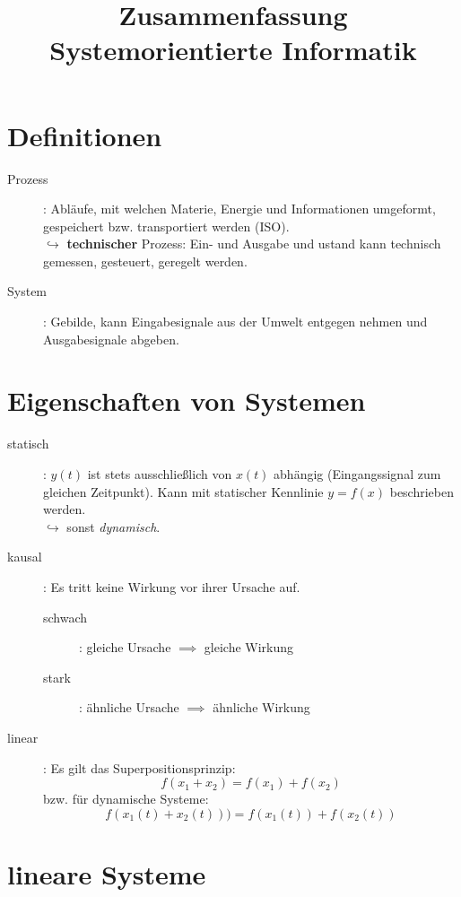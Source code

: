 \documentclass[a4paper, 11pt]{scrartcl}
\title{Zusammenfassung Systemorientierte Informatik}
\theoremstyle{definition}
\begin{document}
\section{Definitionen}
\begin{description}
    \item[Prozess]: Abläufe, mit welchen Materie, Energie und Informationen umgeformt, gespeichert bzw. transportiert werden (ISO).\\
        $\hookrightarrow$ \textbf{technischer} Prozess:  Ein- und Ausgabe und ustand kann technisch gemessen, gesteuert, geregelt werden.
    \item[System]: Gebilde, kann Eingabesignale aus der Umwelt entgegen nehmen und Ausgabesignale abgeben.
\end{description}

\section{Eigenschaften von Systemen}

\begin{description}
    \item[statisch]: $y(t)$ ist stets ausschließlich von $x(t)$ abhängig (Eingangssignal zum gleichen Zeitpunkt). Kann mit statischer Kennlinie $y=f(x)$ beschrieben werden.\\
        $\hookrightarrow$ sonst \emph{dynamisch}.
    \item[kausal]: Es tritt keine Wirkung vor ihrer Ursache auf.
        \begin{description}
            \item[schwach]: gleiche Ursache $\implies$ gleiche Wirkung
            \item[stark]: ähnliche Ursache $\implies$ ähnliche Wirkung
        \end{description}
    \item[linear]: Es gilt das Superpositionsprinzip: 
        \[f(x_1+x_2)=f(x_1)+f(x_2)\]
    bzw. für dynamische Systeme:
        \[f(x_1(t) + x_2(t)))=f(x_1(t)) + f(x_2(t))\]
\end{description}

\section{lineare Systeme}
\end{document}
